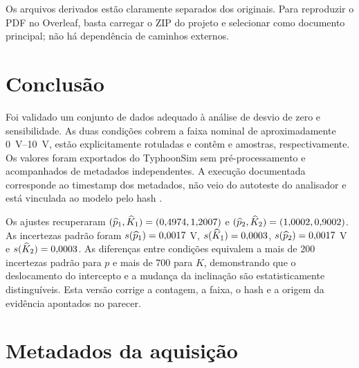 \documentclass[12pt,a4paper]{article}
\newcommand{\arquivo}[1]{\texttt{\detokenize{#1}}}
\begin{document}
Os arquivos derivados estão claramente separados dos originais. Para reproduzir o PDF no Overleaf, basta carregar o ZIP do projeto e selecionar \arquivo{main.tex} como documento principal; não há dependência de caminhos externos.

\clearpage
\section{Conclusão}

Foi validado um conjunto de dados adequado à análise de desvio de zero e sensibilidade. As duas condições cobrem a faixa nominal de aproximadamente \SIrange{0}{10}{\volt}, estão explicitamente rotuladas e contêm \AmostrasUm{} e \AmostrasDois{} amostras, respectivamente. Os valores foram exportados do TyphoonSim sem pré-processamento e acompanhados de metadados independentes. A execução documentada corresponde ao timestamp dos metadados, não veio do autoteste do analisador e está vinculada ao modelo pelo hash \HashModeloCurto.

Os ajustes recuperaram $(\widehat p_1,\widehat K_1)=(0{,}4974,1{,}2007)$ e $(\widehat p_2,\widehat K_2)=(1{,}0002,0{,}9002)$. As incertezas padrão foram $s(\widehat p_1)=0{,}0017$ V, $s(\widehat K_1)=0{,}0003$, $s(\widehat p_2)=0{,}0017$ V e $s(\widehat K_2)=0{,}0003$. As diferenças entre condições equivalem a mais de 200 incertezas padrão para $p$ e mais de 700 para $K$, demonstrando que o deslocamento do intercepto e a mudança da inclinação são estatisticamente distinguíveis. Esta versão corrige a contagem, a faixa, o hash e a origem da evidência apontados no parecer.

\clearpage
\appendix
\section{Metadados da aquisição}
\end{document}
